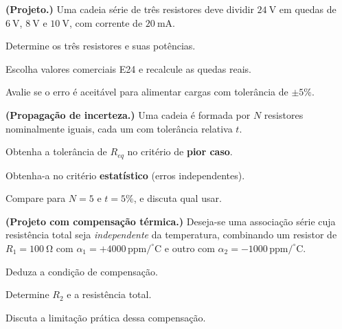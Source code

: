 \blocodesafio
\begin{questao}[4]{}

\textbf{(Projeto.)} Uma cadeia série de três resistores deve dividir
$\SI{24}{\volt}$ em quedas de $\SI{6}{\volt}$, $\SI{8}{\volt}$ e
$\SI{10}{\volt}$, com corrente de $\SI{20}{\milli\ampere}$.
\begin{itensq}
\item Determine os três resistores e suas potências.
\item Escolha valores comerciais E24 e recalcule as quedas reais.
\item Avalie se o erro é aceitável para alimentar cargas com tolerância de
      $\pm5\%$.
\end{itensq}


\end{questao}
\begin{questao}[4]{}

\textbf{(Propagação de incerteza.)} Uma cadeia é formada por $N$ resistores
nominalmente iguais, cada um com tolerância relativa $t$.
\begin{itensq}
\item Obtenha a tolerância de $R_{eq}$ no critério de \textbf{pior caso}.
\item Obtenha-a no critério \textbf{estatístico} (erros independentes).
\item Compare para $N=5$ e $t=5\%$, e discuta qual usar.
\end{itensq}


\end{questao}
\begin{questao}[4]{}

\textbf{(Projeto com compensação térmica.)} Deseja-se uma associação série cuja
resistência total seja \emph{independente} da temperatura, combinando um
resistor de $R_1=\SI{100}{\ohm}$ com $\alpha_1=+4000\,\mathrm{ppm/^{\circ}C}$ e
outro com $\alpha_2=-1000\,\mathrm{ppm/^{\circ}C}$.
\begin{itensq}
\item Deduza a condição de compensação.
\item Determine $R_2$ e a resistência total.
\item Discuta a limitação prática dessa compensação.
\end{itensq}


\end{questao}
